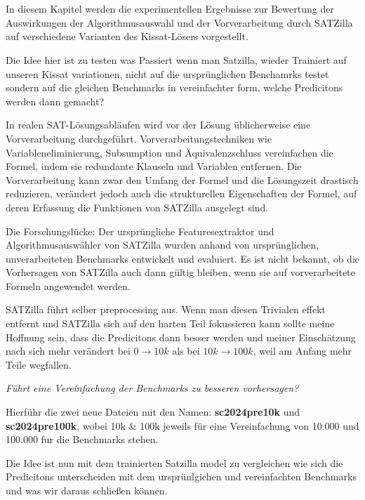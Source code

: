 \section{}\label{sec:kissat_results}

In diesem Kapitel werden die experimentellen Ergebnisse zur Bewertung der Auswirkungen der 
Algorithmusauswahl und der Vorverarbeitung durch SATZilla auf verschiedene Varianten des Kissat-Lösers 
vorgestellt.

Die Idee hier ist zu testen was Passiert wenn man Satzilla, wieder Trainiert auf unseren Kissat variationen, 
nicht auf die ursprünglichen Benchamrks testet sondern auf die gleichen Benchmarks in vereinfachter form,
welche Predicitons werden dann gemacht?

In realen SAT-Lösungsabläufen wird vor der Lösung üblicherweise eine Vorverarbeitung durchgeführt. 
Vorverarbeitungstechniken wie Variableneliminierung, Subsumption und Äquivalenzschluss vereinfachen 
die Formel, indem sie redundante Klauseln und Variablen entfernen. Die Vorverarbeitung kann zwar 
den Umfang der Formel und die Lösungszeit drastisch reduzieren, verändert jedoch auch die 
strukturellen Eigenschaften der Formel, auf deren Erfassung die Funktionen von SATZilla ausgelegt sind.

Die Forschungslücke: Der ursprüngliche Featuresextraktor und Algorithmusauswähler von SATZilla wurden 
anhand von ursprünglichen, unverarbeiteten Benchmarks entwickelt und evaluiert. Es ist nicht bekannt, ob 
die Vorhersagen von SATZilla auch dann gültig bleiben, wenn sie auf vorverarbeitete Formeln angewendet 
werden.

SATZilla führt selber preprocessing aus. Wenn man diesen Trivialen effekt entfernt und SATZilla sich auf den 
harten Teil fokussieren kann sollte meine Hoffnung sein, dass die Predicitons dann besser werden und 
meiner Einschätzung nach sich mehr verändert bei $0\rightarrow10k$ als bei $10k\rightarrow100k$, weil am 
Anfang mehr Teile wegfallen.

\textit{Führt eine Vereinfachung der Benchmarks zu besseren vorhersagen?}

Hierführ die zwei neue Dateien mit den Namen: \textbf{sc2024pre10k} und 
\textbf{sc2024pre100k}, wobei 10k \& 100k jeweils für eine Vereinfachung von 10.000 und 100.000 fur die 
Benchmarks stehen.\cite{runtimes2025}

Die Idee ist nun mit dem trainierten Satzilla model zu vergleichen wie sich die Predicitons unterscheiden
mit dem ursprünlgichen und vereinfachten Benchmarks und was wir daraus schließen können.

